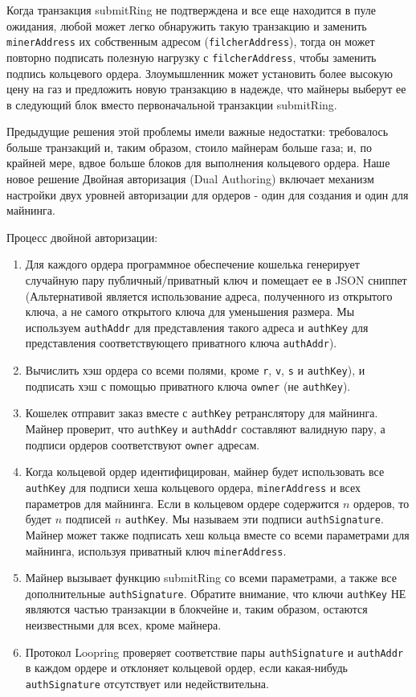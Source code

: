 \documentclass[utf8,nofonts]{article}
\begin{document}
\begin{multicols}{2}
			Когда транзакция submitRing не подтверждена и все еще находится в пуле ожидания, любой может легко обнаружить такую транзакцию и заменить \verb|minerAddress| их собственным адресом (\verb|filcherAddress|), тогда он может повторно подписать полезную нагрузку с \verb|filcherAddress|, чтобы заменить подпись кольцевого ордера. Злоумышленник может установить более высокую цену на газ и предложить новую транзакцию в надежде, что майнеры выберут ее в следующий блок вместо первоначальной транзакции submitRing.
			
			Предыдущие решения этой проблемы имели важные недостатки: требовалось больше транзакций и, таким образом, стоило майнерам больше газа; и, по крайней мере, вдвое больше блоков для выполнения кольцевого ордера. Наше новое решение Двойная авторизация (Dual Authoring) \cite{dualauthor} включает механизм настройки двух уровней авторизации для ордеров - один для создания и один для майнинга.
			
			Процесс двойной авторизации:
			\begin{enumerate}
			\item Для каждого ордера программное обеспечение кошелька генерирует случайную пару публичный/приватный ключ и помещает ее в JSON сниппет (Альтернативой является использование адреса, полученного из открытого ключа, а не самого открытого ключа для уменьшения размера. Мы используем \verb|authAddr| для представления такого адреса и \verb|authKey| для представления соответствующего приватного ключа \verb|authAddr|).
			\item Вычислить хэш ордера со всеми полями, кроме \verb|r|, \verb|v|, \verb|s| и \verb|authKey|), и подписать хэш с помощью приватного ключа \verb|owner| (не \verb|authKey|).
			\item Кошелек отправит заказ вместе с \verb|authKey| ретранслятору для майнинга. Майнер проверит, что \verb|authKey| и \verb|authAddr| составляют валидную пару, а подписи ордеров соответствуют \verb|owner| адресам.
			\item Когда кольцевой ордер идентифицирован, майнер будет использовать все \verb|authKey| для подписи хеша кольцевого ордера, \verb|minerAddress| и всех параметров для майнинга. Если в кольцевом ордере содержится $ n $ ордеров, то будет $ n $ подписей $ n $ \verb|authKey|. Мы называем эти подписи \verb|authSignature|. Майнер может также подписать хеш кольца вместе со всеми параметрами для майнинга, используя приватный ключ \verb|minerAddress|.
			\item Майнер вызывает функцию submitRing со всеми параметрами, а также все дополнительные \verb|authSignature|. Обратите внимание, что ключи \verb|authKey| НЕ являются частью транзакции в блокчейне и, таким образом, остаются неизвестными для всех, кроме майнера.
			\item Протокол Loopring проверяет  соответствие пары \verb|authSignature| и \verb|authAddr| в каждом ордере и отклоняет кольцевой ордер, если какая-нибудь \verb|authSignature| отсутствует или недействительна.
			

\end{enumerate}
\end{multicols}
\end{document}

